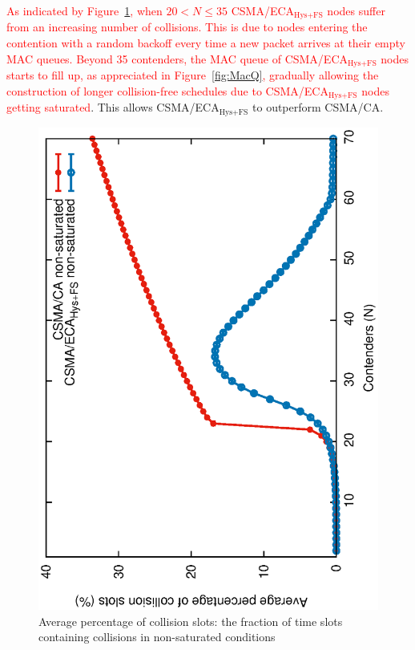 	\textcolor{red}{As indicated by Figure~\ref{fig:collisions-unsat}, when $20<N\leq 35$ CSMA/ECA$_{\text{Hys+FS}}$ nodes suffer from an increasing number of  collisions. This is due to nodes entering the contention with a random backoff every time a new packet arrives at their empty MAC queues. Beyond 35 contenders, the MAC queue of CSMA/ECA$_{\text{Hys+FS}}$ nodes starts to fill up, as appreciated in Figure~\ref{fig:MacQ}, gradually allowing the construction of longer collision-free schedules due to CSMA/ECA$_{\text{Hys+FS}}$ nodes getting saturated}. This allows CSMA/ECA$_{\text{Hys+FS}}$ to outperform CSMA/CA.\\
		
   	\begin{figure}[tb]
		\centering
		\includegraphics[width=0.7\linewidth,angle=-90]{figures/unsaturated/collision-unsaturated/collisions-unsaturated-TON.eps}
		\caption{Average percentage of collision slots: the fraction of time slots containing collisions in non-saturated conditions}
		\label{fig:collisions-unsat}
	\end{figure}	
	
